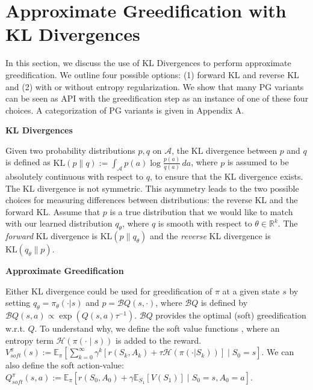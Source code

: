 \documentclass{article}
\newcommand{\Ex}{\mathbb{E}}
\newcommand{\R}{\mathbb{R}}
\newcommand{\actionspace}{\mathcal{A}}
\newcommand{\Qhat}{{Q}}
\newcommand{\KL}{\mathrm{KL}}
\newcommand{\policyparams}{\theta}
\newcommand{\boltzmannQ}{\mathcal{B}Q}
\newcommand{\entropy}{\mathcal{H}}
\newcommand{\defeq}{:=}
\begin{document}
\section{Approximate Greedification with KL Divergences}\label{sec:sac}

In this section, we discuss the use of KL Divergences to perform approximate greedification. We outline four possible options: (1) forward KL and reverse KL and (2) with or without entropy regularization. We show that many PG variants can be seen as API with the greedification step as an instance of one of these four choices. A categorization of PG variants is given in Appendix A. 

\textbf{KL Divergences}

Given two probability distributions $p, q$ on $\actionspace$, the KL divergence between $p$ and $q$ is defined as $ \KL(p \parallel q) \defeq \int_\actionspace p(a) \log\frac{p(a)}{q(a)}\, da$,
%
where $p$ is assumed to be {absolutely continuous} \citep{billingsley2008probability} with respect to $q$, to ensure that the KL divergence exists. 
%
The KL divergence is not symmetric. This asymmetry leads to the two possible choices for measuring differences between distributions: the reverse KL and the forward KL. Assume that $p$ is a true distribution that we would like to match with our learned distribution $q_\theta$, where  $q$ is smooth with respect to $\theta \in \R^k$. The \textit{forward} KL divergence is $\KL(p \parallel q_\theta)$ and the \textit{reverse} KL divergence is $\KL(q_\theta \parallel p)$. 


\textbf{Approximate Greedification}

Either KL divergence could be used for greedification of $\pi$ at a given state $s$ by setting $q_\theta = \pi_\policyparams(\cdot | s)$ and $p =  \boltzmannQ(s, \cdot)$, where $\boltzmannQ$ is defined by $\boltzmannQ(s, a) \propto \exp(\Qhat(s, a)\tau^{-1})$.
%
$\boltzmannQ$ provides the optimal (soft) greedification w.r.t. $\Qhat$. To understand why, we define the soft value functions \citep{ziebart2010modeling}, where an entropy term $\entropy(\pi(\cdot \mid s))$ is added to the reward. $V^{\pi}_{soft}(s) \defeq  \Ex_\pi\left[ \sum_{k = 0}^\infty \gamma^k \left[ r(S_k, A_k) + \tau \entropy(\pi(\cdot|S_k))\right] \mid S_0 = s \right]$. We can also define the soft action-value: $Q^{\pi}_{soft}(s,a) \defeq  \Ex_\pi\left[ r(S_0, A_0) + \gamma \Ex_{S_1}[V(S_1)] \mid S_0 = s, A_0 = a \right]$.
\end{document}
